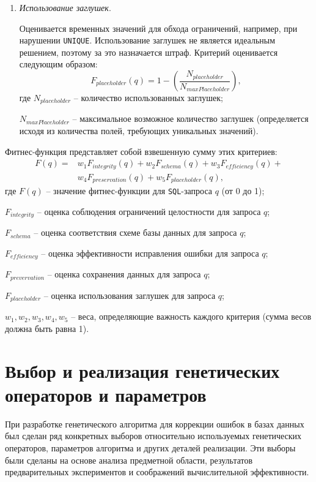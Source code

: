 \documentclass[master,paper]{pmk-graduate}
\begin{document}
\begin{enumerate}
	\item \textit{Использование заглушек}.
	
	Оценивается временных значений для обхода ограничений, например, при нарушении \texttt{UNIQUE}. Использование заг\-лушек не является идеальным решением, поэтому за это назначается штраф. Критерий оценивается следующим образом:
	$$F_{placeholder}(q)=1-\left(\frac{N_{placeholder}}{N_{maxPlaceholder}}\right),$$
	где $N_{placeholder}$ -- количество использованных заглушек;
	
	$N_{maxPlaceholder}$ -- максимальное возможное количество заглушек (определяется исходя из количества полей, требующих уникальных значений).
\end{enumerate}

Фитнес-функция представляет собой взвешенную сумму этих критериев:
\begin{equation}
	\begin{split}
		F(q) = {} & w_1 F_{integrity}(q) + w_2 F_{schema}(q) + w_3 F_{efficiency}(q) + \\
		& w_4 F_{preservation}(q) + w_5 F_{placeholder}(q),
	\end{split}
\end{equation}
где $F(q)$ -- значение фитнес-функции для \texttt{SQL}-запроса $q$ (от 0 до 1);

$F_{integrity}$ -- оценка соблюдения ограничений целостности для запроса $q$;

$F_{schema}$ -- оценка соответствия схеме базы данных для запроса $q$;

$F_{efficiency}$ -- оценка эффективности исправления ошибки для запроса $q$;

$F_{prevervation}$ -- оценка сохранения данных для запроса $q$;

$F_{placeholder}$ -- оценка использования заглушек для запроса $q$;

$w_1,w_2,w_3,w_4,w_5$ -- веса, определяющие важность каждого критерия (сумма весов должна быть равна 1).

\section{Выбор и реализация генетических операторов и параметров}
\label{sec23}

При разработке генетического алгоритма для коррекции ошибок в базах данных был сделан ряд конкретных выборов относительно используемых генетических операторов, параметров алгоритма и других деталей реализации. Эти выборы были сделаны на основе анализа предметной области, результатов предварительных экспериментов и соображений вычислительной эффективности.
\end{document}
